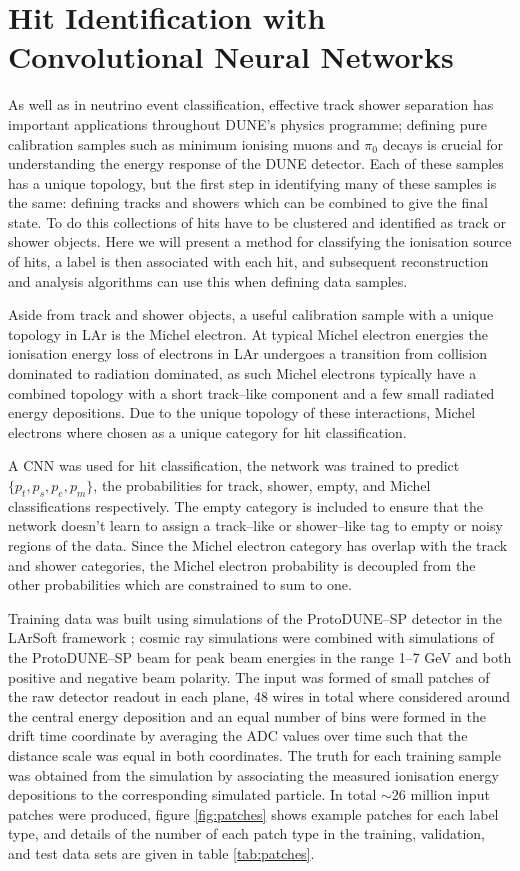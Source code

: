 \section{Hit Identification with Convolutional Neural Networks}
\label{hit-id}

As well as in neutrino event classification, effective track shower separation
has important applications throughout DUNE's physics programme; defining pure
calibration samples such as minimum ionising muons and \(\pi_0\) decays is
crucial for understanding the energy response of the DUNE detector. Each of
these samples has a unique topology, but the first step in identifying many of
these samples is the same: defining tracks and showers which can be combined to
give the final state. To do this collections of hits have to be clustered and
identified as track or shower objects. Here we will present a method for
classifying the ionisation source of hits, a label is then associated with each
hit, and subsequent reconstruction and analysis algorithms can use this when
defining data samples.

Aside from track and shower objects, a useful calibration sample with a unique
topology in LAr is the Michel electron. At typical Michel electron energies the
ionisation energy loss of electrons in LAr undergoes a transition from collision
dominated to radiation dominated, as such Michel electrons typically have a
combined topology with a short track--like component and a few small radiated
energy depositions. Due to the unique topology of these interactions, Michel
electrons where chosen as a unique category for hit classification. 

A CNN was used for hit classification, the network was trained to predict
\(\{p_t, p_s, p_e, p_m\}\), the probabilities for track, shower, empty, and
Michel classifications respectively. The empty category is included to ensure
that the network doesn't learn to assign a track--like or shower--like tag to
empty or noisy regions of the data. Since the Michel electron category has
overlap with the track and shower categories, the Michel electron probability is
decoupled from the other probabilities which are constrained to sum to one.

Training data was built using simulations of the ProtoDUNE--SP detector in the
LArSoft framework \cite{Snider2017}; cosmic ray simulations were combined with
simulations of the ProtoDUNE--SP beam for peak beam energies in the range 1--7
GeV and both positive and negative beam polarity. The input was formed of small
patches of the raw detector readout in each plane, 48 wires in total where
considered around the central energy deposition and an equal number of bins were
formed in the drift time coordinate by averaging the ADC values over time such
that the distance scale was equal in both coordinates. The truth for each
training sample was obtained from the simulation by associating the measured
ionisation energy depositions to the corresponding simulated particle. In total
\(\sim26\) million input patches were produced, figure \ref{fig:patches} shows
example patches for each label type, and details of the number of each patch
type in the training, validation, and test data sets are given in table
\ref{tab:patches}. 

